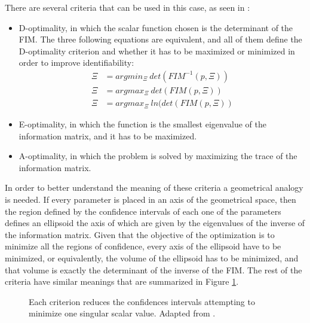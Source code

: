 There are several criteria that can be used in this case, as seen in \cite{franceschini2008model}:
\begin{itemize}
	\item D-optimality, in which the scalar function chosen is the determinant of the FIM. The three following equations are equivalent, and all of them define the D-optimality criterion and whether it has to be maximized or minimized in order to improve identifiability:
	\begin{align}
		\Xi &= argmin_{\Xi} \: det(FIM^{-1}(p, \Xi)) \label{eq:Doptimality1} \\
		\Xi &= argmax_{\Xi} \: det(FIM(p, \Xi)) \label{eq:Doptimality2} \\
	  \Xi &= argmax_{\Xi} \: ln(det(FIM(p, \Xi)) \label{eq:Doptimality3}
	\end{align}
	\item E-optimality, in which the function is the smallest eigenvalue of the information matrix, and it has to be maximized.
	\item A-optimality, in which the problem is solved by maximizing the trace of the information matrix.
\end{itemize}
In order to better understand the meaning of these criteria a geometrical analogy is needed. If every parameter is placed in an axis of the geometrical space, then the region defined by the confidence intervals of each one of the parameters defines an ellipsoid the axis of which are given by the eigenvalues of the inverse of the information matrix. Given that the objective of the optimization is to minimize all the regions of confidence, every axis of the ellipsoid have to be minimized, or equivalently, the volume of the ellipsoid has to be minimized, and that volume is exactly the determinant of the inverse of the FIM. The rest of the criteria have similar meanings that are summarized in Figure \ref{fig:criteria}.

\begin{figure}[hbtp]
\centering
{}\caption{Each criterion reduces the confidences intervals attempting to minimize one singular scalar value. Adapted from \cite{franceschini2008model}.}
\label{fig:criteria}
\end{figure}

